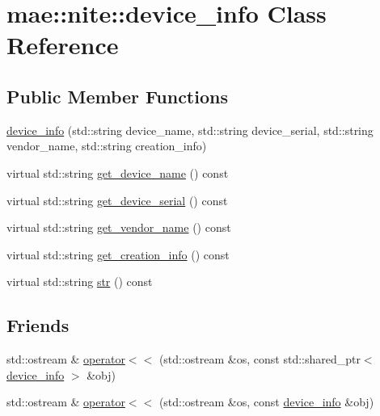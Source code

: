 \hypertarget{classmae_1_1nite_1_1device__info}{\section{mae\-:\-:nite\-:\-:device\-\_\-info Class Reference}
\label{classmae_1_1nite_1_1device__info}
}
\subsection*{Public Member Functions}
\begin{DoxyCompactItemize}
\item 
\hyperlink{classmae_1_1nite_1_1device__info_a12c9f54dcd17a13dba7395e1c614156e}{device\-\_\-info} (std\-::string device\-\_\-name, std\-::string device\-\_\-serial, std\-::string vendor\-\_\-name, std\-::string creation\-\_\-info)
\item 
virtual std\-::string \hyperlink{classmae_1_1nite_1_1device__info_a146bb2e6d347c51e4884deda987a0694}{get\-\_\-device\-\_\-name} () const 
\item 
virtual std\-::string \hyperlink{classmae_1_1nite_1_1device__info_ab6a9a4aefb74b14184325421d9d044ca}{get\-\_\-device\-\_\-serial} () const 
\item 
virtual std\-::string \hyperlink{classmae_1_1nite_1_1device__info_abe6480f2e99988bde294113e8d2321ac}{get\-\_\-vendor\-\_\-name} () const 
\item 
virtual std\-::string \hyperlink{classmae_1_1nite_1_1device__info_ad4194bd00622daeb00426650e0c3f556}{get\-\_\-creation\-\_\-info} () const 
\item 
virtual std\-::string \hyperlink{classmae_1_1nite_1_1device__info_a30298bd4bec27d97886660d1164978b8}{str} () const 
\end{DoxyCompactItemize}
\subsection*{Friends}
\begin{DoxyCompactItemize}
\item 
std\-::ostream \& \hyperlink{classmae_1_1nite_1_1device__info_a26004836b5d6132cf9b19c7b95aab888}{operator$<$$<$} (std\-::ostream \&os, const std\-::shared\-\_\-ptr$<$ \hyperlink{classmae_1_1nite_1_1device__info}{device\-\_\-info} $>$ \&obj)
\item 
std\-::ostream \& \hyperlink{classmae_1_1nite_1_1device__info_a1ff7d247ebb4625af718ff0874ad78ca}{operator$<$$<$} (std\-::ostream \&os, const \hyperlink{classmae_1_1nite_1_1device__info}{device\-\_\-info} \&obj)
\end{DoxyCompactItemize}


